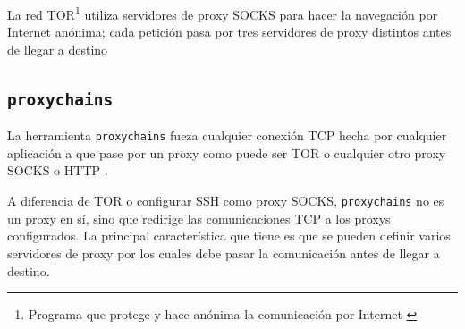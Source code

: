 \vspace*{5mm}

La red TOR\footnote{Programa que protege y hace anónima la comunicación por Internet \autocite{TOR}} utiliza servidores de proxy SOCKS para hacer la navegación por Internet anónima; cada petición pasa por tres servidores de proxy distintos antes de llegar a destino

\subsection{\texttt{proxychains}}

La herramienta \texttt{proxychains} fueza cualquier conexión TCP hecha por cualquier aplicación a que pase por un proxy como puede ser TOR o cualquier otro proxy SOCKS o HTTP \autocite{ProxyChainsHowTo}. 

A diferencia de TOR o configurar SSH como proxy SOCKS, \texttt{proxychains} no es un proxy en sí, sino que redirige las comunicaciones TCP a los proxys configurados. La principal característica que tiene es que se pueden definir varios servidores de proxy por los cuales debe pasar la comunicación antes de llegar a destino.














\clearpage
\printbibliography


